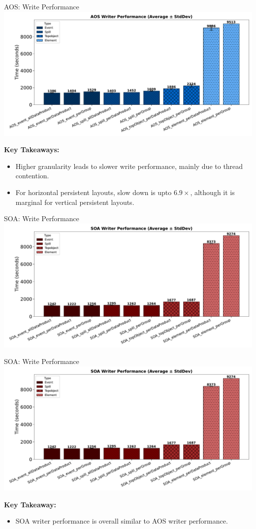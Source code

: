 \documentclass[aspectratio=169]{beamer}
\begin{document}
\begin{frame}{AOS: Write Performance}
\centering
\includegraphics[width=0.5\linewidth]{../experiments/Seaborn/AOSWriter_blue_shaded.pdf}

\textbf{Key Takeaways:}
\begin{itemize}
\item Higher granularity leads to slower write performance, mainly due to thread contention.
\item For horizontal persistent layouts, slow down is upto $6.9\times$, although it is marginal for vertical persistent layouts.
\end{itemize}
\end{frame}

\begin{frame}{SOA: Write Performance}
\centering
\includegraphics[width=0.9\linewidth]{../experiments/Seaborn/SOAWriter_shaded.pdf}
\end{frame}

\begin{frame}{SOA: Write Performance}
  \centering
  \includegraphics[width=0.5\linewidth]{../experiments/Seaborn/SOAWriter_shaded.pdf}
  
  \textbf{Key Takeaway:}
  \begin{itemize}
  \item SOA writer performance is overall similar to AOS writer performance.

  \end{itemize}
\end{frame}
\end{document}
